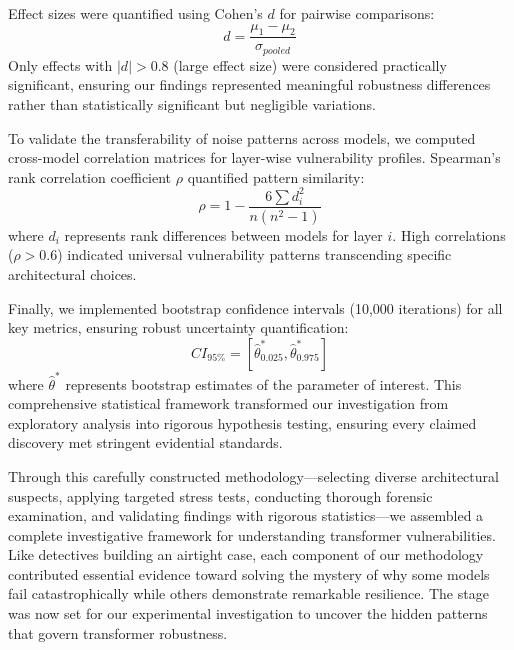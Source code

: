 Effect sizes were quantified using Cohen's $d$ for pairwise comparisons:
\begin{equation}
d = \frac{\mu_1 - \mu_2}{\sigma_{pooled}}
\end{equation}
Only effects with $|d| > 0.8$ (large effect size) were considered practically significant, ensuring our findings represented meaningful robustness differences rather than statistically significant but negligible variations.

To validate the transferability of noise patterns across models, we computed cross-model correlation matrices for layer-wise vulnerability profiles. Spearman's rank correlation coefficient $\rho$ quantified pattern similarity:
\begin{equation}
\rho = 1 - \frac{6\sum d_i^2}{n(n^2 - 1)}
\end{equation}
where $d_i$ represents rank differences between models for layer $i$. High correlations ($\rho > 0.6$) indicated universal vulnerability patterns transcending specific architectural choices.

Finally, we implemented bootstrap confidence intervals (10,000 iterations) for all key metrics, ensuring robust uncertainty quantification:
\begin{equation}
CI_{95\%} = [\hat{\theta}^*_{0.025}, \hat{\theta}^*_{0.975}]
\end{equation}
where $\hat{\theta}^*$ represents bootstrap estimates of the parameter of interest. This comprehensive statistical framework transformed our investigation from exploratory analysis into rigorous hypothesis testing, ensuring every claimed discovery met stringent evidential standards.

Through this carefully constructed methodology—selecting diverse architectural suspects, applying targeted stress tests, conducting thorough forensic examination, and validating findings with rigorous statistics—we assembled a complete investigative framework for understanding transformer vulnerabilities. Like detectives building an airtight case, each component of our methodology contributed essential evidence toward solving the mystery of why some models fail catastrophically while others demonstrate remarkable resilience. The stage was now set for our experimental investigation to uncover the hidden patterns that govern transformer robustness.